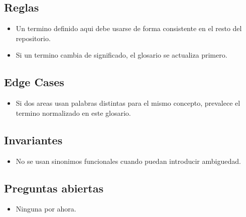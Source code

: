 \subsection{Reglas}

\begin{itemize}
  \item Un termino definido aqui debe usarse de forma consistente en el resto del repositorio.
  \item Si un termino cambia de significado, el glosario se actualiza primero.
\end{itemize}

\subsection{Edge Cases}

\begin{itemize}
  \item Si dos areas usan palabras distintas para el mismo concepto, prevalece el termino normalizado en este glosario.
\end{itemize}

\subsection{Invariantes}

\begin{itemize}
  \item No se usan sinonimos funcionales cuando puedan introducir ambiguedad.
\end{itemize}

\subsection{Preguntas abiertas}

\begin{itemize}
  \item Ninguna por ahora.
\end{itemize}
